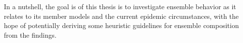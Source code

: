 In a nutshell, the goal is of this thesis is to investigate ensemble behavior as it relates to its member models and the current epidemic circumstances, with the hope of potentially deriving some heuristic guidelines for ensemble composition from the findings.
\newpage
